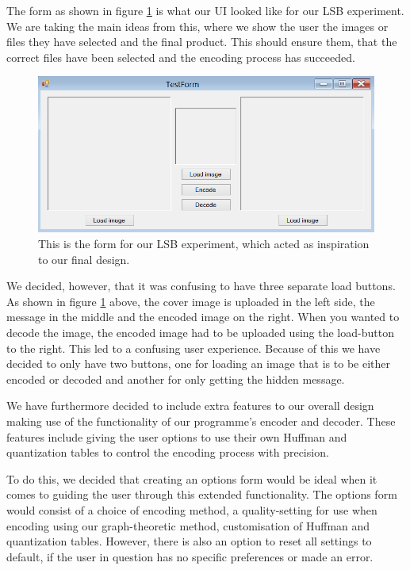 The form as shown in figure \ref{fig:LSBForm} is what our UI looked like for our LSB experiment.
We are taking the main ideas from this, where we show the user the images or files they have selected and the final product. This should ensure them, that the correct files have been selected and the encoding process has succeeded.
\begin{figure}
	\centering
	\includegraphics[width=\textwidth]{figures/LSBForm.png}
	\caption{This is the form for our LSB experiment, which acted as inspiration to our final design.}
	\label{fig:LSBForm}
\end{figure}
We decided, however, that it was confusing to have three separate load buttons.
As shown in figure \ref{fig:LSBForm} above, the cover image is uploaded in the left side, the message in the middle and the encoded image on the right.
When you wanted to decode the image, the encoded image had to be uploaded using the load-button to the right. This led to a confusing user experience.
Because of this we have decided to only have two buttons, one for loading an image that is to be either encoded or decoded and another for only getting the hidden message.

We have furthermore decided to include extra features to our overall design making use of the functionality of our programme's encoder and decoder.
These features include giving the user options to use their own Huffman and quantization tables to control the encoding process with precision.

To do this, we decided that creating an options form would be ideal when it comes to guiding the user through this extended functionality.
The options form would consist of a choice of encoding method, a quality-setting for use when encoding using our graph-theoretic method, customisation of Huffman and quantization tables.
However, there is also an option to reset all settings to default, if the user in question has no specific preferences or made an error.

